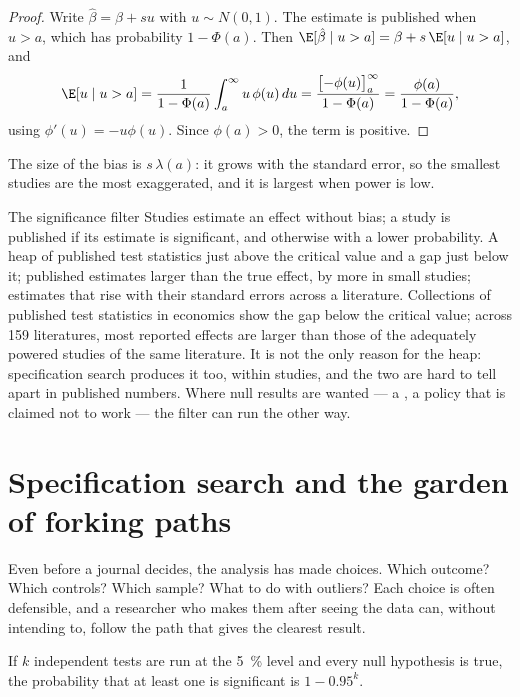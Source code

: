 \begin{proof}
Write $\hat\beta = \beta + s u$ with $u \sim N(0, 1)$. The estimate is published
when $u > a$, which has probability $1 - \Phi(a)$. Then $\E[\hat\beta \mid u > a]
= \beta + s\,\E[u \mid u > a]$, and
\[
  \E[u \mid u > a] = \frac{1}{1 - \Phi(a)} \int_a^\infty u\,\phi(u)\, du
  = \frac{\bigl[-\phi(u)\bigr]_a^\infty}{1 - \Phi(a)} = \frac{\phi(a)}{1 - \Phi(a)},
\]
using $\phi'(u) = -u\phi(u)$. Since $\phi(a) > 0$, the term is positive.
\end{proof}

The size of the bias is $s\,\lambda(a)$: it grows with the standard error, so the
smallest studies are the most exaggerated, and it is largest when power is low.

\begin{model}{The significance filter}
\assumes Studies estimate an effect without bias; a study is published if its
estimate is significant, and otherwise with a lower probability.
\predicts A heap of published test statistics just above the critical value
and a gap just below it; published estimates larger than the true effect, by
more in small studies; estimates that rise with their standard errors across a
literature.
\tested Collections of published test statistics in economics show the gap below
the critical value; across 159 literatures, most reported effects are larger
than those of the adequately powered studies of the same literature.
\breaks It is not the only reason for the heap: specification search produces
it too, within studies, and the two are hard to tell apart in published numbers.
Where null results are wanted --- a , a policy that is claimed not to
work --- the filter can run the other way.
\end{model}

\section{Specification search and the garden of forking paths}\label{sec:b3:credible-empirical-work:forking}

Even before a journal decides, the analysis has made choices. Which outcome?
Which controls? Which sample? What to do with outliers? Each choice is often
defensible, and a researcher who makes them after seeing the data can, without
intending to, follow the path that gives the clearest result.

\begin{proposition}\label{prop:b3:credible-empirical-work:many}
If $k$ independent tests are run at the 5~\% level and every null hypothesis is
true, the probability that at least one is significant is $1 - 0.95^k$.
\end{proposition}

